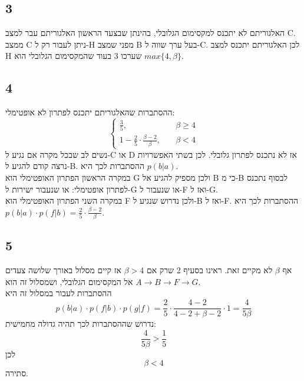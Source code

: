 \documentclass{article}
\begin{document}
\subsection*{3}
האלגוריתם לא יתכנס למקסימום הגלובלי, בהינתן שבצעד הראשון האלגוריתם עבר למצב C$.$ ממצב C ניתן לעבור רק ל-H מפני שמצב B בעל ערך שווה ל-C$.$ לכן האלגוריתם יתכנס למצב H שערכו 3 בעוד שהמקסימום הגלובלי הוא
$max\{4, \beta\}$.
\subsection*{4}
ההסתברות שהאלגוריתם יתכנס לפתרון לא אופטימלי:
$$\left\{\begin{array}{ll}
\frac{3}{5},& \quad \beta \geq 4\\
1-\frac{2}{5}\cdot \frac{\beta-2}{\beta},& \quad \beta < 4
\end{array}\right.$$
נשים לב שבכל מקרה אם נגיע ל-C או D אז לא נתכנס לפתרון גלובלי. לכן בשתי האפשרויות נרצה קודם להגיע ל-B$.$ ההסתברות לכך היא 
$p(b|a)$.\\
במקרה הראשון הפתרון האופטימלי הוא G ולכן מספיק להגיע אל B כי מ-B לבסוף נתכנס לפתרון אופטימלי: או שנעבור ישירות ל-G או שנעבור ל-F ואז ל-G$.$\\
במקרה השני הפתרון האופטימלי הוא F ולכן נדרוש שנגיע ל-B ואז ל-F$.$ ההסתברות לכך היא 
$p(b|a) \cdot p(f|b) = \frac{2}{5} \cdot \frac{\beta-2}{\beta}$.
\subsection*{5}
אף 
$\beta$
לא מקיים זאת. ראינו בסעיף 2 שרק אם 
$\beta > 4$
אז קיים מסלול באורך שלושה צעדים אל המקסימום הגלובלי, ושמסלול זה הוא
$A \rightarrow B \rightarrow F \rightarrow G$.\\
ההסתברות לעבור במסלול זה היא
$$p(b|a) \cdot p(f|b) \cdot p(g|f) = \frac{2}{5} \cdot \frac{4-2}{4-2 + \beta-2} \cdot 1 = \frac{4}{5\beta}$$
נדרוש שההסתברות לכך תהיה גדולה מחמישית:
$$\frac{4}{5\beta} > \frac{1}{5}$$
לכן
$$\beta < 4$$
סתירה.
\end{document}
